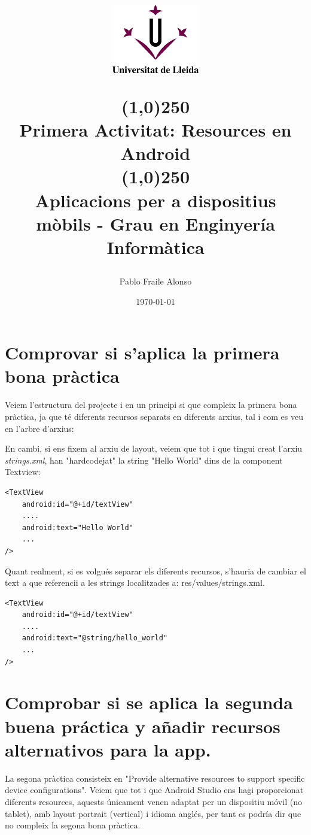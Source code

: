 \documentclass[12pt, letterpaper]{article}
\title{%
    \begin{center}
	\includegraphics[width=4cm,height=3cm]{udl.png}
    \end{center}
    \line(1,0){250}\\[0.3cm]
    \textbf{Primera Activitat: Resources en Android} \\
    \line(1,0){250}
    \\[0.5cm]
	\large Aplicacions per a dispositius mòbils - Grau en Enginyería Informàtica
}
\author{Pablo Fraile Alonso}
\date{\today}
\begin{document}
    
\maketitle
\thispagestyle{empty}
\newpage
\tableofcontents
\listoffigures
\listoftables
\newpage

\section{Comprovar si s'aplica la primera bona pràctica}
Veiem l'estructura del projecte i en un principi si que compleix la primera bona pràctica, ja que té diferents recursos separats en diferents arxius, tal i com es veu en l'arbre d'arxius:


En cambi, si ens fixem al arxiu de layout, veiem que tot i que tingui creat l'arxiu \textit{strings.xml}, han "hardcodejat" la string "Hello World" dins de la component Textview:
\begin{verbatim}
<TextView
    android:id="@+id/textView"
    ....
    android:text="Hello World"
    ...
/>
\end{verbatim}

Quant realment, si es volgués separar els diferents recursos, s'hauria de cambiar el text a que referencii a les strings localitzades a: res/values/strings.xml.

\begin{verbatim}
<TextView
    android:id="@+id/textView"
    ....
    android:text="@string/hello_world"
    ...
/>
\end{verbatim}

\section{Comprobar si se aplica la segunda buena práctica y añadir recursos alternativos para la app. }
La segona pràctica consisteix en "Provide alternative resources to support specific device configurations". Veiem que tot i que Android Studio ens hagi proporcionat diferents resources, aquests únicament venen adaptat
per un dispositiu móvil (no tablet), amb layout portrait (vertical) i idioma anglés, per tant es podría dir que no compleix la segona bona pràctica.
\end{document}
